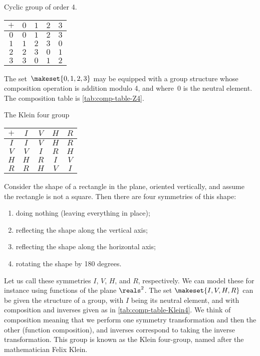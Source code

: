 \begin{margintable}
    \caption{Cyclic group of order 4.}
    \label{tab:comp-table-Z4}
    \centering
    \begin{tabular}{c|cccc}
        $+$ & $0$ & $1$ & $2$ & $3$ \\
        \hline
        $0$ & $0$ & $1$ & $2$ & $3$ \\
        $1$ & $1$ & $2$ & $3$ & $0$ \\
        $2$ & $2$ & $3$ & $0$ & $1$ \\
        $3$ & $3$ & $0$ & $1$ & $2$
    \end{tabular}
\end{margintable}

\begin{example}
    \label{exa:grp-Z4}
    The set~$\makeset{0, 1, 2, 3 }$ may be equipped with a group structure whose composition operation is addition modulo 4, and where~$0$ is the neutral element.
    The composition table is \cref{tab:comp-table-Z4}.
\end{example}

\begin{margintable}
    \caption{The Klein four group}
    \label{tab:comp-table-Klein4}
    \centering
    \begin{tabular}{c|cccc}
        $+$ & $I$ & $V$ & $H$ & $R$ \\
        \hline
        $I$ & $I$ & $V$ & $H$ & $R$ \\
        $V$ & $V$ & $I$ & $R$ & $H$ \\
        $H$ & $H$ & $R$ & $I$ & $V$ \\
        $R$ & $R$ & $H$ & $V$ & $I$
    \end{tabular}
\end{margintable}
\begin{example}
    \label{exa:grp-Klein4}
    Consider the shape of a rectangle in the plane, oriented vertically, and assume the rectangle is not a square.
    Then there are four symmetries of this shape:
    \begin{enumerate}
        \item doing nothing (leaving everything in place);
        \item reflecting the shape along the vertical axis;
        \item reflecting the shape along the horizontal axis;
        \item rotating the shape by 180 degrees.
    \end{enumerate}
    Let us call these symmetries $I$, $V$, $H$, and $R$, respectively.
    We can model these for instance using  functions of the plane $\reals^2$.
    The set $\makeset{I, V, H, R}$ can be given the structure of a group, with $I$ being its neutral element, and with composition and inverses given as in \cref{tab:comp-table-Klein4}.
    We think of composition meaning that we perform one symmetry transformation and then the other (function composition), and inverses correspond to taking the inverse transformation.
    This group is known as the Klein four-group, named after the mathematician Felix Klein.
\end{example}

